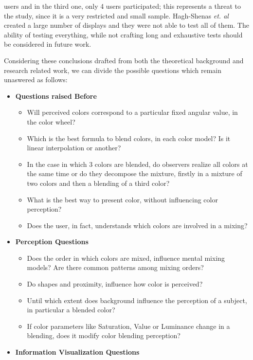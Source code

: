 users and in the third one, only 4 users participated; this represents a threat to the study, since it is a
very restricted and small sample. Hagh-Shenas \emph{et. al} created a large number of displays and they were not able
to test all of them. The ability of testing everything, while not crafting long and exhaustive tests should be
considered in future work. \par
%
Considering these conclusions drafted from both the theoretical background and research related work, we can divide the
possible questions which remain unaswered as follows:
%
\begin{itemize}
	\setlength\itemsep{0.1em}
	\item \textbf{Questions raised Before}
    \begin{itemize}
    	\setlength\itemsep{0.1em}
			\item Will perceived colors correspond to a particular fixed angular value, in the color wheel?
      \item Which is the best formula to blend colors, in each color model? Is it linear interpolation or another?
      \item In the case in which 3 colors are blended, do observers realize all colors at the same time or do they
			decompose the mixture, firstly in a mixture of two colors and then a blending of a third color?
      \item What is the best way to present color, without influencing color perception?
      \item Does the user, in fact, understands which colors are involved in a mixing?
		\end{itemize}
  \item \textbf{Perception Questions}
    \begin{itemize}
    	\setlength\itemsep{0.1em}
    	\item Does the order in which colors are mixed, influence mental mixing models? Are there common patterns among mixing orders?
      \item Do shapes and proximity, influence how color is perceived?
      \item Until which extent does background influence the perception of a subject, in particular a blended color?
      \item If color parameters like Saturation, Value or Luminance change in a blending, does it modify color blending perception?
    \end{itemize}
  \item \textbf{Information Visualization Questions}

\end{itemize}
